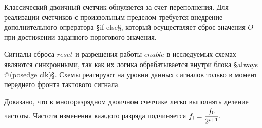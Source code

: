 Классический двоичный счетчик обнуляется за счет переполнения. Для реализации счетчиков с произвольным пределом требуется внедрение дополнительного опрератора \texttt§if-else§, который осуществляет сброс значения $O$ при достижении заданного порогового значения.

Сигналы сброса $reset$ и разрешения работы $enable$ в исследуемых схемах являются синхронными, так как их логика обрабатывается внутри блока \texttt§always @(posedge clk)§. Схемы реагируют на уровни данных сигналов только в момент переднего фронта тактового сигнала.

Доказано, что в многоразрядном двоичном счетчике легко выполнять деление частоты. Частота изменения каждого разряда подчиняется $f_i = \cfrac{f_{0}}{2^{i+1}}$.